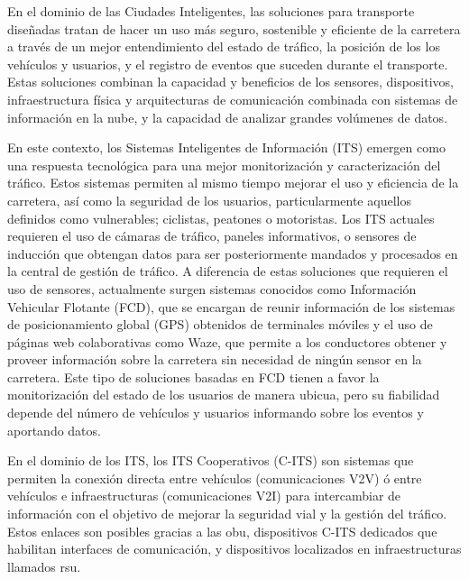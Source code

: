 En el dominio de las Ciudades Inteligentes, las soluciones para transporte diseñadas tratan de hacer un uso más
seguro, sostenible y eficiente de la carretera a través de un mejor entendimiento del estado de tráfico, la posición
de los los vehículos y usuarios, y el registro de eventos que suceden durante el transporte. Estas soluciones
combinan la capacidad y beneficios de los sensores, dispositivos, infraestructura física y arquitecturas de
comunicación combinada con sistemas de información en la nube, y la capacidad de analizar grandes volúmenes de datos.

En este contexto, los Sistemas Inteligentes de Información (ITS) emergen como una respuesta tecnológica para una mejor
monitorización y caracterización del tráfico. Estos sistemas permiten al mismo tiempo mejorar el uso y eficiencia de la
carretera, así como la seguridad de los usuarios, particularmente aquellos definidos como vulnerables; ciclistas,
peatones o motoristas. Los ITS actuales requieren el uso de cámaras de tráfico, paneles informativos, o sensores de
inducción que obtengan datos para ser posteriormente mandados y procesados en la central de gestión de tráfico. A
diferencia de estas soluciones que requieren el uso de sensores, actualmente surgen sistemas conocidos como Información
Vehicular Flotante (FCD), que se encargan de reunir información de los sistemas de posicionamiento global (GPS)
obtenidos de terminales móviles y el uso de páginas web colaborativas como Waze, que permite a los conductores obtener
y proveer información sobre la carretera sin necesidad de ningún sensor en la carretera. Este tipo de soluciones basadas
en FCD tienen a favor la monitorización del estado de los usuarios de manera ubicua, pero su fiabilidad depende del
número de vehículos y usuarios informando sobre los eventos y aportando datos.

En el dominio de los ITS, los ITS Cooperativos (C-ITS) son sistemas que permiten la conexión directa entre vehículos
(comunicaciones V2V) ó entre vehículos e infraestructuras (comunicaciones V2I) para intercambiar de información con
el objetivo de mejorar la seguridad vial y la gestión del tráfico. Estos enlaces son posibles gracias a las \gls{obu},
dispositivos C-ITS dedicados que habilitan interfaces de comunicación, y dispositivos localizados en infraestructuras
llamados \gls{rsu}.

